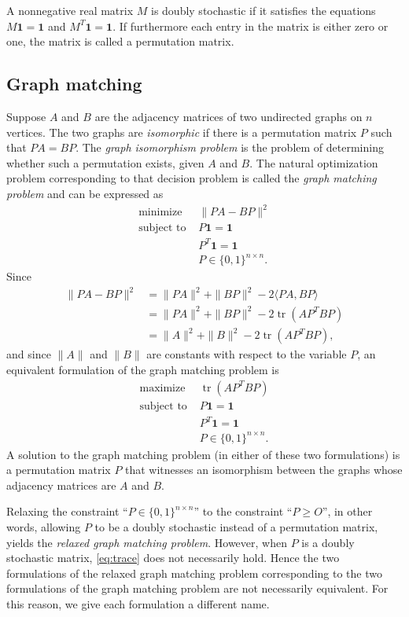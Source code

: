 \documentclass{article}
\newcommand{\1}{\mathbf{1}}
\DeclareMathOperator{\tr}{tr}
\begin{document}
A nonnegative real matrix $M$ is doubly stochastic if it satisfies the equations $M \mathbf{1} = \mathbf{1}$ and $M^T \mathbf{1} = \mathbf{1}$.
If furthermore each entry in the matrix is either zero or one, the matrix is called a permutation matrix.

\subsection{Graph matching}

Suppose $A$ and $B$ are the adjacency matrices of two undirected graphs on $n$ vertices.
The two graphs are \emph{isomorphic} if there is a permutation matrix $P$ such that $PA = BP$.
The \emph{graph isomorphism problem} is the problem of determining whether such a permutation exists, given $A$ and $B$.
The natural optimization problem corresponding to that decision problem is called the \emph{graph matching problem} and can be expressed as
\begin{align*}
  \text{minimize } & \|PA - BP\|^2 \\
  \text{subject to } & P \1 = \1 \\
  & P^T \1 = \1 \\
  & P \in \{0, 1\}^{n \times n}.
\end{align*}
Since
\begin{align}\label{eq:trace}
  \|PA - BP\|^2 & = \|PA\|^2 + \|BP\|^2 - 2 \langle PA, BP \rangle \nonumber \\
  & = \|PA\|^2 + \|BP\|^2 - 2 \tr(AP^TBP) \nonumber \\
  & = \|A\|^2 + \|B\|^2 - 2 \tr(AP^TBP),
\end{align}
and since $\|A\|$ and $\|B\|$ are constants with respect to the variable $P$, an equivalent formulation of the graph matching problem is
\begin{align*}
  \text{maximize } & \tr(AP^TBP) \\
  \text{subject to } & P \1 = \1 \\
  & P^T \1 = \1 \\
  & P \in \{0, 1\}^{n \times n}.
\end{align*}
A solution to the graph matching problem (in either of these two formulations) is a permutation matrix $P$ that witnesses an isomorphism between the graphs whose adjacency matrices are $A$ and $B$.

Relaxing the constraint ``$P \in \{0, 1\}^{n \times n}$'' to the constraint ``$P \geq O$'', in other words, allowing $P$ to be a doubly stochastic instead of a permutation matrix, yields the \emph{relaxed graph matching problem}.
However, when $P$ is a doubly stochastic matrix, \autoref{eq:trace} does not necessarily hold.
Hence the two formulations of the relaxed graph matching problem corresponding to the two formulations of the graph matching problem are not necessarily equivalent.
For this reason, we give each formulation a different name.
\end{document}

